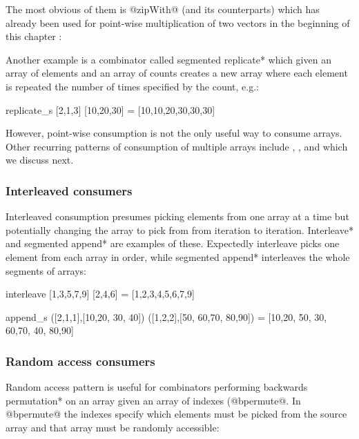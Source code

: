 \documentclass[preamble.tex]{subfiles}
\begin{document}
The most obvious of them is @zipWith@ (and its  counterparts) which has already been used for point-wise multiplication of two vectors in the beginning of this chapter :


Another example is a combinator called \*segmented replicate* which given an array of elements and an array of counts creates a new array where each element is repeated the number of times specified by the count, e.g.:

\begin{hscode}
replicate_s [2,1,3] [10,20,30] = [10,10,20,30,30,30]
\end{hscode}


However, point-wise consumption is not the only useful way to consume arrays. Other recurring patterns of consumption of multiple arrays include , ,  and  which we discuss next.


\subsubsection{Interleaved consumers}

Interleaved consumption presumes picking elements from one array at a time but potentially changing the array to pick from from iteration to iteration. \*Interleave* and \*segmented append* are examples of these. Expectedly interleave picks one element from each array in order, while \*segmented append* interleaves the whole segments of arrays:

\begin{hscode}
interleave [1,3,5,7,9] [2,4,6] = [1,2,3,4,5,6,7,9]

append_s ([2,1,1],[10,20, 30, 40]) ([1,2,2],[50, 60,70, 80,90])
  = [10,20, 50, 30, 60,70, 40, 80,90]
\end{hscode}


\subsubsection{Random access consumers}

Random access pattern is useful for combinators performing \*backwards permutation* on an array given an array of indexes (@bpermute@. In @bpermute@ the indexes specify which elements must be picked from the source array and that array must be randomly accessible:
\end{document}
